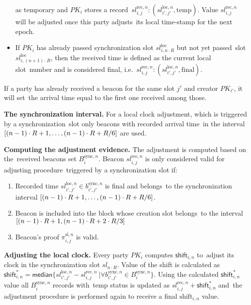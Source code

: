 \begin{legal}
\begin{itemize}
        as temporary and $PK_i$ stores a record\
        ${{sl^{\text{rec}, n}_{i, j}}: (sl_{i', j'}^{\text{loc}, n}, \text{temp})}$.
        Value ${{sl^{\text{rec}, n}_{i, j}}}$ will be adjusted once this party adjusts\
        its local time-stamp for the next epoch.
        \item If $PK_i$ has already passed synchronization slot $sl_{i, n \cdot R}^{\text{loc}}$ but not yet passed\
        slot $sl_{i, (n + 1) \cdot R}^{\text{loc}}$, then the received time is defined as the current local slot\
        number and is considered final, i.e.\
        ${{sl^{\text{rec}, n}_{i, j}}: (sl_{i', j'}^{\text{loc}, n}, \text{final})}$.
    \end{itemize}
    If a party has already received a beacon for the same slot $j'$ and creator $PK_{i'}$, it will set\
    the arrival time equal to the ﬁrst one received among those.
    \item[]\textbf{The synchronization interval.} For a local clock adjustment, which is triggered by a synchronization\
    slot only beacons with recorded arrival time\
    in the interval ${[(n - 1) \cdot R + 1,\dots,(n-1) \cdot R + R \// 6]}$ are used.
    \item[]\textbf{Computing the adjustment evidence.} The adjustment is computed based on the\
    received beacons set $B_i^{\text{sync}, n}$.
    Beacon ${sl^{\text{rec}, n}_{i, j}}$ is only considered valid for adjusting procedure\
    triggered by a synchronization slot if:
    \begin{enumerate}
        \item Recorded time ${sl_{i', j'}^{\text{loc}, n} \in b_{i', j'}^{\text{sync}, n}}$ is final and belongs\
        to the synchronization interval ${[(n - 1) \cdot R + 1,\dots,(n-1) \cdot R + R \// 6]}$.
        \item Beacon is included into the block whose creation slot belongs\
        to the interval ${[(n - 1) \cdot R + 1, (n - 1) \cdot R + 2 \cdot R \// 3]}$
        \item Beacon's proof $\pi_{i, j}^{\text{sl}, n}$ is valid.
    \end{enumerate}
    \item[]\textbf{Adjusting the local clock.} Every party $PK_i$ computes $\textsf{shift}_{i, n}$ to\
    adjust its clock in the synchronization slot $sl_{n \cdot R}$.
    Value of the shift is calculated as\
    ${\textsf{shift}^*_{i, n} = \textsf{median} \{sl_{i', j'}^{\text{loc}, n} - sl^{\text{rec}, n}_{i, j}\
    | \forall b_{i', j'}^{\text{sync}, n} \in B_i^{\text{sync}, n}\}}$.
    Using the calculated ${\textsf{shift}^*_{i, n}}$ value all $B_i^{\text{sync}, n}$ records with\
    $\text{temp}$ status is updated as ${sl^{\text{rec}, n}_{i, j} + \textsf{shift}^*_{i, n}}$ and\
    the adjustment procedure is performed again to receive a final $\text{shift}_{i, n}$ value.
\end{legal}


